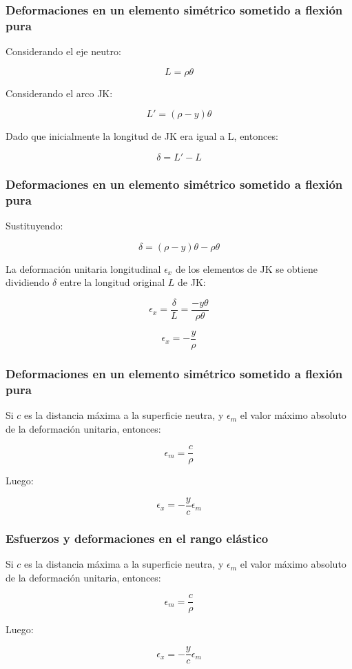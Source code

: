 \documentclass{beamer}
\begin{document}
\begin{frame}
\justifying
\frametitle{Deformaciones en un elemento simétrico sometido a flexión pura}

Considerando el eje neutro:

$$ 
L = \rho \theta
$$

Considerando el arco JK:

$$ L' = (\rho - y) \theta $$

Dado que inicialmente la longitud de JK era igual a L, entonces:

$$ \delta = L' - L $$
\end{frame}



\begin{frame}
\justifying
\frametitle{Deformaciones en un elemento simétrico sometido a flexión pura}

Sustituyendo:

$$  \delta = (\rho - y) \theta - \rho\theta $$

La deformación unitaria longitudinal $\epsilon_x$ de los elementos de JK 
se obtiene dividiendo $\delta$ entre la longitud original $L$ de JK:

$$ \epsilon_x = \frac{\delta}{L} = \frac{-y\theta}{\rho\theta} $$

$$ \epsilon_x= - \frac{y}{\rho} $$
\end{frame}



\begin{frame}
\justifying
\frametitle{Deformaciones en un elemento simétrico sometido a flexión pura}

Si $c$ es la distancia máxima a la superficie neutra, y $\epsilon_m$ el valor máximo absoluto de 
la deformación unitaria, entonces:

$$ \epsilon_m = \frac{c}{\rho} $$

Luego:

$$ \epsilon_x = -\frac{y}{c}\epsilon_m $$
\end{frame}



\begin{frame}
\justifying
\frametitle{Esfuerzos y deformaciones en el rango elástico}

Si $c$ es la distancia máxima a la superficie neutra, y $\epsilon_m$ el valor máximo absoluto de 
la deformación unitaria, entonces:

$$ \epsilon_m = \frac{c}{\rho} $$

Luego:

$$ \epsilon_x = -\frac{y}{c}\epsilon_m $$
\end{frame}
\end{document}
